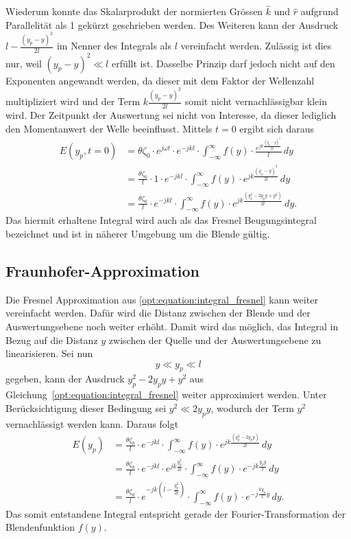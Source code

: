 Wiederum konnte das Skalarprodukt der normierten Grössen $\hat{k}$ und $\hat{r}$ aufgrund Parallelität als 1 gekürzt geschrieben werden.
Des Weiteren kann der Ausdruck $l - \frac{(y_p-y)^2}{2l}$ im Nenner des Integrals als $l$ vereinfacht werden.
Zulässig ist dies nur, weil $(y_p - y)^2 \ll l$ erfüllt ist.
Dasselbe Prinzip darf jedoch nicht auf den Exponenten angewandt werden, da dieser mit dem Faktor der Wellenzahl multipliziert wird und der Term $k \frac{(y_p-y)^2}{2l}$ somit nicht vernachlässigbar klein wird.
Der Zeitpunkt der Auswertung sei nicht von Interesse, da dieser lediglich den Momentanwert der Welle beeinflusst.
Mittels $t = 0$ ergibt sich daraus
\begin{align}
E(y_p, t = 0)
&=
\theta\zeta_0 \cdot e^{j\omega t} \cdot e^{-jkl} \cdot \int_{-\infty}^{\infty}f(y)\cdot\frac{e^{jk\frac{(y_p-y)^2}{2l}}}{l} \,dy
\\
&=
\frac{\theta\zeta_0}{l} \cdot 1 \cdot e^{-jkl} \cdot \int_{-\infty}^{\infty}f(y)\cdot e^{jk\frac{(y_p-y)^2}{2l}} \,dy
\\
&=
\frac{\theta\zeta_0}{l} \cdot e^{-jkl} \cdot \int_{-\infty}^{\infty}f(y)\cdot e^{jk\frac{(y_p^2 - 2y_py + y^2)}{2l}} \,dy
.
\label{opt:equation:integral_fresnel}
\end{align}
Das hiermit erhaltene Integral wird auch als das Fresnel Beugungsintegral bezeichnet und ist in näherer Umgebung um die Blende gültig.

\subsection{Fraunhofer-Approximation}
\label{opt:sec:fraunhofer}
Die Fresnel Approximation aus \ref{opt:equation:integral_fresnel} kann weiter vereinfacht werden.
Dafür wird die Distanz zwischen der Blende und der Auswertungsebene noch weiter erhöht.
Damit wird das möglich, das Integral in Bezug auf die Distanz $y$ zwischen der Quelle und der Auswertungsebene zu linearisieren.
Sei nun
\begin{equation}
y
\ll
y_p
\ll
l
\end{equation}
gegeben, kann der Ausdruck $y_p^2 - 2y_py + y^2$ aus Gleichung~\ref{opt:equation:integral_fresnel} weiter approximiert werden.
Unter Berücksichtigung dieser Bedingung sei $y^2 \ll 2y_py$, wodurch der Term $y^2$ vernachlässigt werden kann.
Daraus folgt
\begin{align}
E(y_p)
&=
\frac{\theta\zeta_0}{l} \cdot e^{-jkl} \cdot \int_{-\infty}^{\infty}f(y)\cdot e^{jk\frac{(y_p^2 - 2y_py)}{2l}} \,dy
\\
&=
\frac{\theta\zeta_0}{l} \cdot e^{-jkl} \cdot e^{jk\frac{y_p^2}{2l}} \cdot \int_{-\infty}^{\infty}f(y)\cdot e^{-jk\frac{y_py}{l}} \,dy
\\
&=
\frac{\theta\zeta_0}{l} \cdot e^{-jk\left(l-\frac{y_p^2}{2l}\right)} \cdot \int_{-\infty}^{\infty}f(y)\cdot e^{-j\frac{ky_p}{l}y} \,dy
.
\label{opt:equation:integral_fraunhofer}
\end{align}
Das somit entstandene Integral entspricht gerade der Fourier-Transformation der Blendenfunktion $f(y)$.

